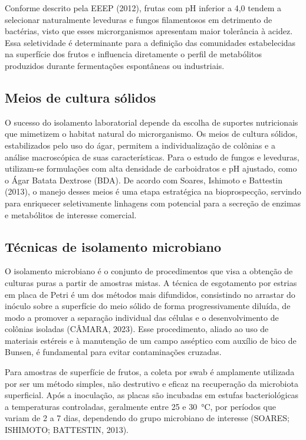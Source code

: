 Conforme descrito pela EEEP (2012), frutas com pH inferior a 4,0 tendem a selecionar naturalmente leveduras e fungos filamentosos em detrimento de bactérias, visto que esses microrganismos apresentam maior tolerância à acidez. Essa seletividade é determinante para a definição das comunidades estabelecidas na superfície dos frutos e influencia diretamente o perfil de metabólitos produzidos durante fermentações espontâneas ou industriais.

\subsection{Meios de cultura sólidos}

O sucesso do isolamento laboratorial depende da escolha de suportes nutricionais que mimetizem o habitat natural do microrganismo. Os meios de cultura sólidos, estabilizados pelo uso do ágar, permitem a individualização de colônias e a análise macroscópica de suas características. Para o estudo de fungos e leveduras, utilizam-se formulações com alta densidade de carboidratos e pH ajustado, como o Ágar Batata Dextrose (BDA). De acordo com Soares, Ishimoto e Battestin (2013), o manejo desses meios é uma etapa estratégica na bioprospecção, servindo para enriquecer seletivamente linhagens com potencial para a secreção de enzimas e metabólitos de interesse comercial.

\subsection{Técnicas de isolamento microbiano}

O isolamento microbiano é o conjunto de procedimentos que visa a obtenção de culturas puras a partir de amostras mistas. A técnica de esgotamento por estrias em placa de Petri é um dos métodos mais difundidos, consistindo no arrastar do inóculo sobre a superfície do meio sólido de forma progressivamente diluída, de modo a promover a separação individual das células e o desenvolvimento de colônias isoladas (CÂMARA, 2023). Esse procedimento, aliado ao uso de materiais estéreis e à manutenção de um campo asséptico com auxílio de bico de Bunsen, é fundamental para evitar contaminações cruzadas.

Para amostras de superfície de frutos, a coleta por swab é amplamente utilizada por ser um método simples, não destrutivo e eficaz na recuperação da microbiota superficial. Após a inoculação, as placas são incubadas em estufas bacteriológicas a temperaturas controladas, geralmente entre 25 e 30~°C, por períodos que variam de 2 a 7 dias, dependendo do grupo microbiano de interesse (SOARES; ISHIMOTO; BATTESTIN, 2013).
